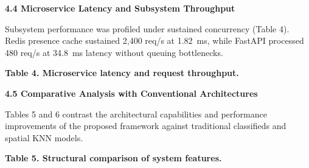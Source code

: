 \documentclass[10pt,twocolumn,a4paper]{article}
\begin{document}
\noindent
{}

\vspace{0.2em}
\noindent
\textbf{4.4 Microservice Latency and Subsystem Throughput}

Subsystem performance was profiled under sustained concurrency (Table 4). Redis presence cache sustained 2,400 req/s at 1.82~ms, while FastAPI processed 480 req/s at 34.8~ms latency without queuing bottlenecks.

\vspace{0.2em}
\noindent
\textbf{Table 4. Microservice latency and request throughput.}
\vspace{0.15em}

\noindent
{}

\vspace{0.2em}
\noindent
\textbf{4.5 Comparative Analysis with Conventional Architectures}

Tables 5 and 6 contrast the architectural capabilities and performance improvements of the proposed framework against traditional classifieds and spatial KNN models.

\vspace{0.2em}
\noindent
\textbf{Table 5. Structural comparison of system features.}
\vspace{0.15em}
\end{document}
